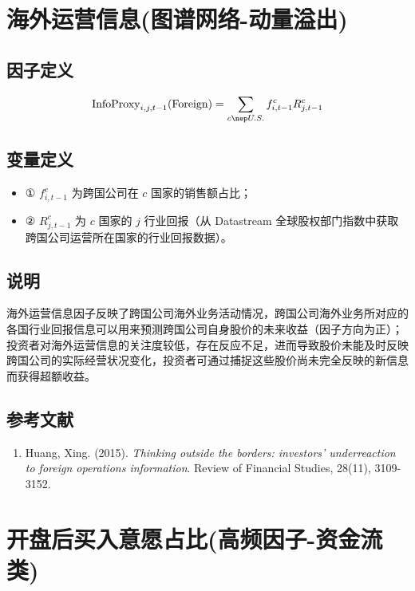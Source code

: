 \documentclass{article}
\begin{document}
\section{海外运营信息(图谱网络-动量溢出)}

\subsection{因子定义}
\begin{equation}
    \mathrm{InfoProxy}_{i,j,t-1}{\mathrm{(Foreign)}} = \sum_{c\nep U.S.} f_{i,t-1}^c R_{j,t-1}^c
\end{equation}

\subsection{变量定义}
\begin{itemize}
    \item ① \( f_{i,t-1}^c \) 为跨国公司在 \( c \) 国家的销售额占比；
    \item ② \( R_{j,t-1}^c \) 为 \( c \) 国家的 \( j \) 行业回报（从 Datastream 全球股权部门指数中获取跨国公司运营所在国家的行业回报数据）。
\end{itemize}

\subsection{说明}
海外运营信息因子反映了跨国公司海外业务活动情况，跨国公司海外业务所对应的各国行业回报信息可以用来预测跨国公司自身股价的未来收益（因子方向为正）；投资者对海外运营信息的关注度较低，存在反应不足，进而导致股价未能及时反映跨国公司的实际经营状况变化，投资者可通过捕捉这些股价尚未完全反映的新信息而获得超额收益。

\subsection{参考文献}
\begin{enumerate}
    \item Huang, Xing. (2015). \textit{Thinking outside the borders: investors' underreaction to foreign operations information}. Review of Financial Studies, 28(11), 3109-3152.
\end{enumerate}

\section{开盘后买入意愿占比(高频因子-资金流类)}
\end{document}
